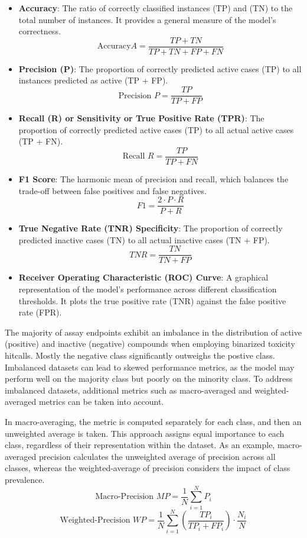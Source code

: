 \begin{itemize}
  \item \textbf{Accuracy}: The ratio of correctly classified instances (TP) and (TN) to the total number of instances. It provides a general measure of the model's correctness.
  \[ \text{Accuracy}  A = \frac{TP + TN}{TP + TN + FP + FN} \]

  \item \textbf{Precision (P)}: The proportion of correctly predicted active cases (TP) to all instances predicted as active (TP + FP). 
  \[ \text{Precision } P = \frac{TP}{TP + FP} \]

  \item \textbf{Recall (R) or Sensitivity or True Positive Rate (TPR)}: The proportion of correctly predicted active cases (TP) to all actual active cases (TP + FN).
  \[ \text{Recall } R = \frac{TP}{TP + FN} \]

  \item \textbf{F1 Score}: The harmonic mean of precision and recall, which balances the trade-off between false positives and false negatives.
  \[ F1 = \frac{2 \cdot P \cdot R}{P + R} \]

  \item \textbf{True Negative Rate (TNR) Specificity}: The proportion of correctly predicted inactive cases (TN) to all actual inactive cases (TN + FP).
  \[ TNR = \frac{TN}{TN + FP} \]

  \item \textbf{Receiver Operating Characteristic (ROC) Curve}: A graphical representation of the model's performance across different classification thresholds. It plots the true positive rate (TNR) against the false positive rate (FPR).
  
\end{itemize}

The majority of assay endpoints exhibit an imbalance in the distribution of active (positive) and inactive (negative) compounds when employing binarized toxicity hitcalls. Mostly the negative class significantly outweighs the postive class. Imbalanced datasets can lead to skewed performance metrics, as the model may perform well on the majority class but poorly on the minority class. To address imbalanced datasets, additional metrics such as macro-averaged and weighted-averaged metrics can be taken into account.

In macro-averaging, the metric is computed separately for each class, and then an unweighted average is taken. This approach assigns equal importance to each class, regardless of their representation within the dataset. As an example, macro-averaged precision calculates the unweighted average of precision across all classes, whereas the weighted-average of precision considers the impact of class prevalence.
\[ \text{Macro-Precision } MP = \frac{1}{N} \sum_{i=1}^{N} P_i \] 
\[ \text{Weighted-Precision } WP = \frac{1}{N} \sum_{i=1}^{N} \left(\frac{TP_i}{TP_i + FP_i}\right) \cdot \frac{N_i}{N} \]

